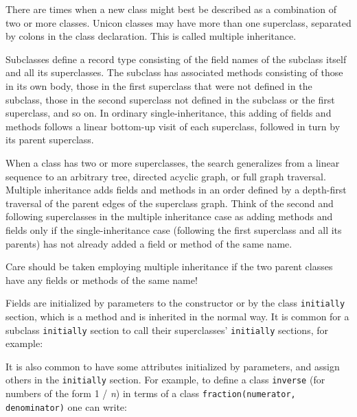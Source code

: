 There are times when a new class might best
be described as a combination of two or more classes. Unicon classes
may have more than one superclass, separated by colons in the class
declaration. This is called multiple inheritance.

Subclasses define a record type consisting of the field names of the
subclass itself and all its superclasses. The subclass has associated
methods consisting of those in its own body, those in the first
superclass that were not defined in the subclass, those in the second
superclass not defined in the subclass or the first superclass, and so
on. In ordinary single-inheritance, this adding of fields and methods
follows a linear bottom-up visit of each superclass,
followed in turn by its parent superclass.

When a class has two or more superclasses, the search generalizes from a
linear sequence to an arbitrary tree, directed acyclic
graph, or full graph traversal.
Multiple inheritance adds fields and
methods in an order defined by a depth-first traversal of the parent
edges of the superclass graph. Think of the second and following
superclasses in the
multiple inheritance case as adding methods and fields only if the
single-inheritance case (following the first superclass and all its
parents) has not already added a field or method of the same name.

\medskip{}
{\sffamily
Care should be taken employing multiple inheritance if the two parent
classes have any fields or methods of the same name! }

Fields are initialized by parameters to the constructor or by the
class \texttt{initially} section, which is a method and is
inherited in the normal way. It is common for a subclass \texttt{initially}
section to call their superclasses'
\texttt{initially} sections, for example:


\noindent
It is also common to have some attributes initialized by parameters, and
assign others in the \texttt{initially} section. For example, to define a
class \texttt{inverse} (for numbers of the form 1 / \textit{n}) in terms
of a class \texttt{fraction(numerator, denominator)} one can write:

